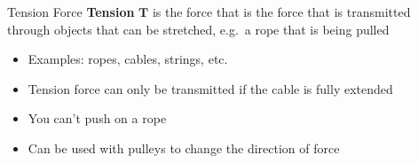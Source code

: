 \documentclass[12pt,compress,aspectratio=169]{beamer}
\begin{document}
%
%



\begin{frame}{Tension Force}
  \textbf{Tension} $\bm T$ is the force that is the force that is transmitted
  through objects that can be stretched, e.g.\ a rope that is being pulled
  \begin{center}
  \end{center}
  \begin{itemize}
  \item Examples: ropes, cables, strings, etc.
  \item Tension force can only be transmitted if the cable is fully extended
  \item You can't push on a rope
  \item Can be used with pulleys to change the direction of force
  \end{itemize}
\end{frame}
\end{document}

